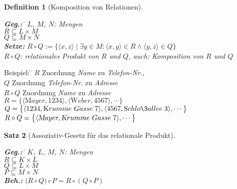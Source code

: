 \documentclass{article}
\def\pair(#1,#2){\langle #1, #2 \rangle}
\newtheorem{Definition}{Definition}
\newtheorem{Satz}[Definition]{Satz}
\begin{document}
\begin{Definition}[Komposition von Relationen] \hspace*{\fill} \\[-0.5cm]
  \begin{tabbing}
  \textbf{Geg.:}  \quad \= $L$, $M$, $N$: Mengen \\[0.1cm]
                  \> $R \subseteq L \times M$  \\[0.1cm]
                  \> $Q \subseteq M \times N$  \\[0.1cm]
  \textbf{Setze:} \> $R \circ Q := \bigl\{ \pair(x,z) \mid \exists y \in M \colon \pair(x,y) \in R \wedge \pair(y,z) \in Q \bigr\}$ \\[0.1cm]
                  \>   $R \circ Q$: relationales Produkt von $R$ und $Q$, auch: Komposition von $R$ und $Q$
  \end{tabbing}
\end{Definition}
\begin{tabbing} 
Beispiel: \= $R$ Zuordnung \textsl{Name} zu \textsl{Telefon-Nr.}, \\[0.1cm]
          \> $Q$ Zuordnung \textsl{Telefon-Nr.} zu \textsl{Adresse}\\[0.1cm]
          \> $R \circ Q$ Zuordnung \textsl{Name} zu \textsl{Adresse}\\[0.1cm]
          \> $R = \bigl\{ \pair(\mathrm{Mayer}, \mathrm{1234}), \pair(\mathrm{Weber}, \mathrm{4567}), \cdots \bigr\}$  \\
          \> $Q = \bigl\{ \pair(\mathrm{1234}, \mathrm{Krumme\ Gasse}\;7), \pair(4567, \mathrm{Schlo\3allee}\; 3), \cdots \bigr\}$  \\
          \> $R \circ Q = \bigl\{ \pair(\textsl{Mayer}, \textsl{Krumme\ Gasse}\;7), \cdots \bigr\}$ 
\end{tabbing}


\begin{Satz}[Assoziativ-Gesetz f\"{u}r das relationale Produkt] \hspace*{\fill} \\[-0.5cm]
  \begin{tabbing}
    \textbf{Geg.:} \quad \= $K$, $L$, $M$, $N$: Mengen \\[0.1cm]
                  \> $R \subseteq K \times L$  \\[0.1cm]
                  \> $Q \subseteq L \times M$  \\[0.1cm]
                  \> $P \subseteq M \times N$  \\[0.1cm]
    \textbf{Beh.:} \> $\bigl(R \circ Q\bigr) \circ P = R \circ (Q \circ P)$
  \end{tabbing}
\end{Satz}
\end{document}
